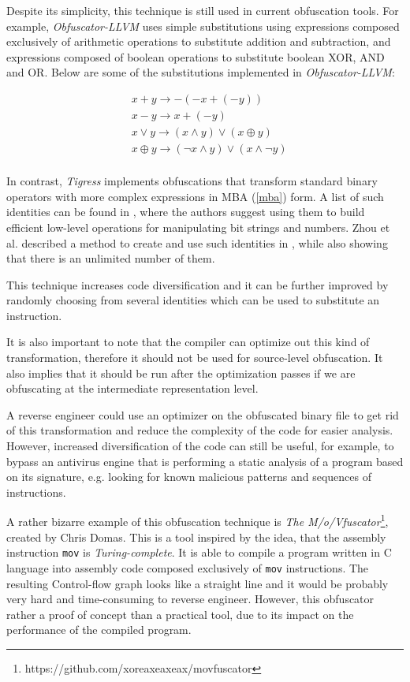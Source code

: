 \documentclass[
  digital, %
  notable,   %
  twoside, %
  nolof,     %
  nolot,     %
]{fithesis3}
\theoremstyle{definition}
\begin{document}
Despite its simplicity, this technique is still used in current obfuscation tools. For example, \textit{Obfuscator-LLVM} uses simple substitutions using expressions composed exclusively of arithmetic operations to substitute addition and subtraction, and expressions composed of boolean operations to substitute boolean XOR, AND and OR. Below are some of the substitutions implemented in \textit{Obfuscator-LLVM}:

$$
    \begin{aligned}
    &x + y \rightarrow -(-x + (-y))\\
    &x - y \rightarrow x + (-y)\\
    &x \vee y \rightarrow (x \wedge y) \vee (x \oplus y)\\
    &x \oplus y \rightarrow (\neg x \wedge y ) \vee (x \wedge \neg y)\\ 
    \end{aligned}
$$

In contrast, \textit{Tigress} implements obfuscations that transform standard binary operators with more complex expressions in MBA (\ref{mba}) form. A list of such identities can be found in \cite{hackers_delight}, where the authors suggest using them to build efficient low-level operations for manipulating bit strings and numbers. Zhou et al. described a method to create and use such identities in \cite{mba_zhou}, while also showing that there is an unlimited number of them. 

This technique increases code diversification and it can be further improved by randomly choosing from several identities which can be used to substitute an instruction. 

It is also important to note that the compiler can optimize out this kind of transformation, therefore it should not be used for source-level obfuscation. It also implies that it should be run after the optimization passes if we are obfuscating at the intermediate representation level. 

A reverse engineer could use an optimizer on the obfuscated binary file to get rid of this transformation and reduce the complexity of the code for easier analysis. However, increased diversification of the code can still be useful, for example, to bypass an antivirus engine that is performing a static analysis of a program based on its signature, e.g. looking for known malicious patterns and sequences of instructions.

A rather bizarre example of this obfuscation technique is \textit{The M/o/Vfuscator}\footnote{https://github.com/xoreaxeaxeax/movfuscator}, created by Chris Domas. This is a tool inspired by the idea, that the assembly instruction \texttt{mov} is \textit{Turing-complete}. It is able to compile a program written in C language into assembly code composed exclusively of \texttt{mov} instructions. The resulting Control-flow graph looks like a straight line and it would be probably very hard and time-consuming to reverse engineer. However, this obfuscator rather a proof of concept than a practical tool, due to its impact on the performance of the compiled program. 
\end{document}
